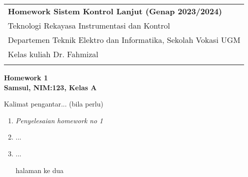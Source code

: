 \documentclass[a4paper,12pt]{article}
\begin{document}

\begin{tabular}{p{15.5cm}} 
{\large \bf Homework Sistem Kontrol Lanjut (Genap 2023/2024)} \\
Teknologi Rekayasa Instrumentasi dan Kontrol \\ Departemen Teknik Elektro dan Informatika, Sekolah Vokasi UGM \\ Kelas kuliah Dr. Fahmizal\\
\hline %
\\
\end{tabular}
\vspace*{0.3cm} 

\begin{center} 
	{\Large \bf Homework 1} 
	\vspace{2mm} \\
	{\bf Samsul, NIM:123, Kelas A}
		
\end{center}  

\vspace{0.4cm}

Kalimat pengantar... (bila perlu)

\begin{enumerate}

\item {\it Penyelesaian homework no 1}

\item ...

\item ...

\newpage

halaman ke dua

\end{enumerate}
\end{document}
